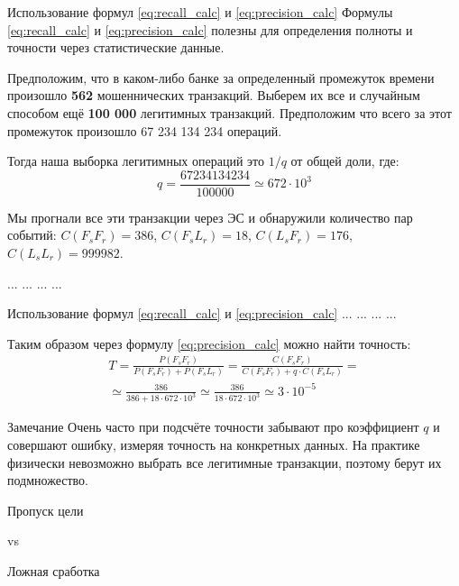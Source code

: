 \documentclass{beamer}
\newcommand{\auditorium}[1]{\color{red}{\textbf{#1}}}
\begin{document}
  \begin{frame}{Использование формул \eqref{eq:recall_calc} и \eqref{eq:precision_calc}}\label{frame:precision_calc_example}
  \small
  Формулы \eqref{eq:recall_calc} и \eqref{eq:precision_calc} полезны 
  для определения полноты и точности через статистические данные.
  
  Предположим, что в каком-либо банке за определенный промежуток времени
  произошло \textbf{562} мошеннических транзакций. 
  Выберем их все и случайным способом ещё \textbf{100 000} легитимных транзакций.
  Предположим что всего за этот промежуток произошло 67 234 134 234 операций. 
  
  Тогда наша выборка легитимных операций это $1/q$ от общей доли, где: 
  \begin{equation*}
  q = \frac{67234134234}{100000} \simeq 672 \cdot 10^3
  \end{equation*}
  
  Мы прогнали все эти транзакции через ЭС и обнаружили количество пар событий:
  $C(F_s F_r)= 386$, 
  $C(F_s L_r)= 18$, 
  $C(L_s F_r)= 176$, 
  $C(L_s L_r)= 999 982$.
   
  ... ... ... ...
  \end{frame}
   
  \begin{frame}{Использование формул \eqref{eq:recall_calc} и \eqref{eq:precision_calc}} 
  ... ... ... ...
  
  Таким образом через формулу  \eqref{eq:precision_calc} можно найти точность:
  \begin{eqnarray*}
  T = \frac{P(F_s F_r)}{P(F_s F_r) + P(F_s L_r )} = 
  \frac{C(F_s F_r)}{C(F_s F_r) + q \cdot C(F_s L_r)}  = \\
  \simeq \frac{386}{386 + 18 \cdot  672 \cdot 10^3 }
  \simeq \frac{386}{18 \cdot  672 \cdot 10^3 }
  \simeq 3 \cdot 10^{-5}
  \end{eqnarray*}
  
  \begin{block}{Замечание}
  	Очень часто при подсчёте точности забывают про коэффициент $q$ 
  	и совершают ошибку, измеряя точность на конкретных данных.
  	На практике физически невозможно выбрать все легитимные транзакции,
  	поэтому берут их подмножество.
  \end{block}

  \auditorium{ДЗ: найдите полноту}
  \end{frame}
  
  \begin{frame}
  \LARGE
  \centering
  Пропуск цели
  
  vs
  
  Ложная сработка
  
  \auditorium{Что важнее?}
  \end{frame}
\end{document}
